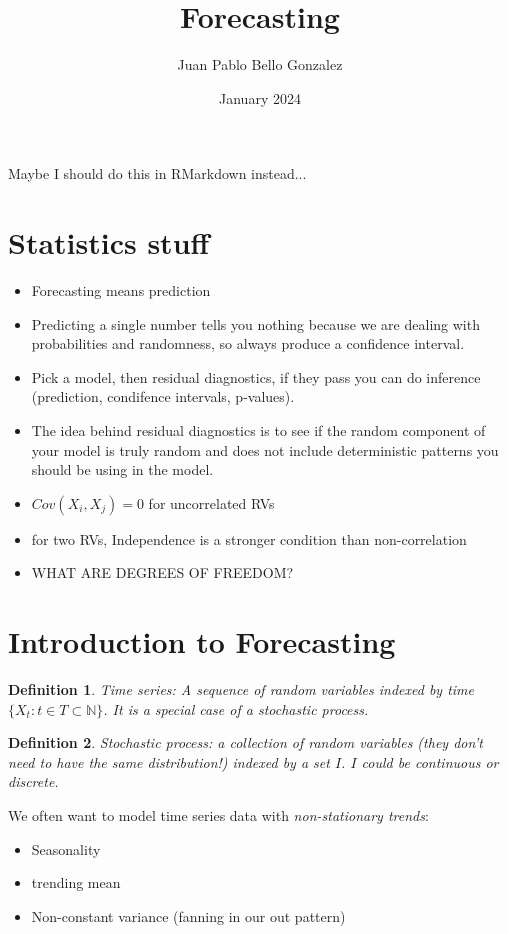 \documentclass{article}
\title{Forecasting}
\author{Juan Pablo Bello Gonzalez}
\date{January 2024}
\newtheorem{definition}{Definition}
\begin{document}
\maketitle

Maybe I should do this in RMarkdown instead...

\section{Statistics stuff}
\begin{itemize}
\item Forecasting means prediction 
\item Predicting a single number tells you nothing because we are dealing with probabilities and randomness, so always produce a confidence interval.
\item Pick a model, then residual diagnostics, if they pass you can do inference (prediction, condifence intervals, p-values). 
\item The idea behind residual diagnostics is to see if the random component of your model is truly random and does not include deterministic patterns you should be using in the model.
\item $Cov(X_i, X_j) = 0$ for uncorrelated RVs
\item for two RVs, Independence is a stronger condition than non-correlation
\item WHAT ARE DEGREES OF FREEDOM?


\end{itemize}

\section{Introduction to Forecasting}

\begin{definition}
Time series: A sequence of random variables indexed by time $\{ X_t : t\in T \subset \mathbb{N}\}$. It is a special case of a stochastic process. 
\end{definition}

\begin{definition}
Stochastic process: a collection of random variables (they don't need to have the same distribution!) indexed by a set $I$. $I$ could be continuous or discrete.
\end{definition}

We often want to model time series data with \textit{non-stationary trends}:
\begin{itemize}
\item Seasonality
\item trending mean
\item Non-constant variance (fanning in our out pattern)
\end{itemize}
\end{document}
